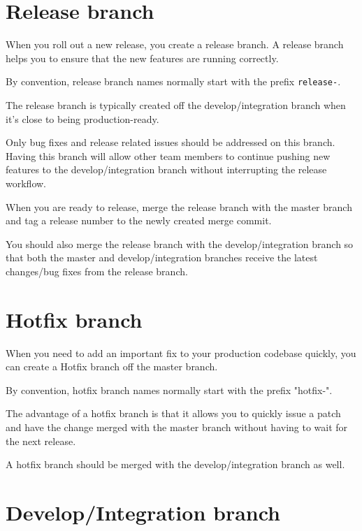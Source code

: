 \documentclass[10pt,a4paper,english]{report}
\begin{document}
    \section{Release branch}
    \label{sec:branching:release-branch}

    When you roll out a new release, you create a release branch. A release branch helps you to ensure that the new features are running correctly.

    By convention, release branch names normally start with the prefix \verb"release-".

    The release branch is typically created off the develop/integration branch when it's close to being production-ready.

    Only bug fixes and release related issues should be addressed on this branch. Having this branch will allow other team members to continue pushing new features to the develop/integration branch without interrupting the release workflow.

    When you are ready to release, merge the release branch with the master branch and tag a release number to the newly created merge commit.

    You should also merge the release branch with the develop/integration branch so that both the master and develop/integration branches receive the latest changes/bug fixes from the release branch.

    \section{Hotfix branch}
    \label{sec:branching:hotfix-branch}

    When you need to add an important fix to your production codebase quickly, you can create a Hotfix branch off the master branch.

    By convention, hotfix branch names normally start with the prefix "hotfix-".

    The advantage of a hotfix branch is that it allows you to quickly issue a patch and have the change merged with the master branch without having to wait for the next release.

    A hotfix branch should be merged with the develop/integration branch as well.

    \section{Develop/Integration branch}
    \label{sec:branching:develop-branch}
\end{document}
